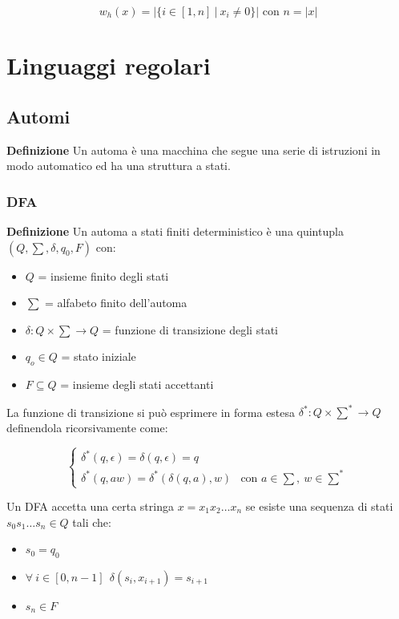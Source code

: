 \documentclass{article}
\begin{document}
$$w_h(x)=|\{i\in[1,n]\ |\ x_i\neq 0\}| \text{ con } n=|x|$$

\newpage

\section{Linguaggi regolari}

\subsection{Automi}

\textbf{Definizione} Un automa è una macchina che segue una serie di istruzioni in modo automatico ed ha una struttura a stati.

\subsubsection{DFA}

\textbf{Definizione} Un automa a stati finiti deterministico è una quintupla $(Q,\sum,\delta,q_0,F)$ con:
\begin{itemize}
    \item $Q$ = insieme finito degli stati
    \item $\sum$ = alfabeto finito dell'automa
    \item $\delta:Q\times \sum \rightarrow Q$ = funzione di transizione degli stati
    \item $q_o\in Q$ = stato iniziale
    \item $F\subseteq Q$ = insieme degli stati accettanti\newline
\end{itemize}

\noindent La funzione di transizione si può esprimere in forma estesa $\delta^*:Q\times\sum^*\rightarrow Q$ definendola ricorsivamente come:

\[
\begin{cases}
\delta^*(q,\epsilon)=\delta(q,\epsilon)=q\\
\delta^*(q,aw)=\delta^*(\delta(q,a),w) & \text{con } a\in\sum,\ w\in\sum^* 
\end{cases}
\]\newline

\noindent Un DFA accetta una certa stringa $x=x_1x_2\ldots x_n$ se esiste una sequenza di stati $s_0s_1\ldots s_n\in Q$ tali che:
\begin{itemize}
    \item $s_0=q_0$
    \item $\forall\ i \in [0,n-1] \ \ \delta(s_i,x_{i+1})=s_{i+1}$
    \item $s_n\in F$\newline
\end{itemize}
\end{document}
